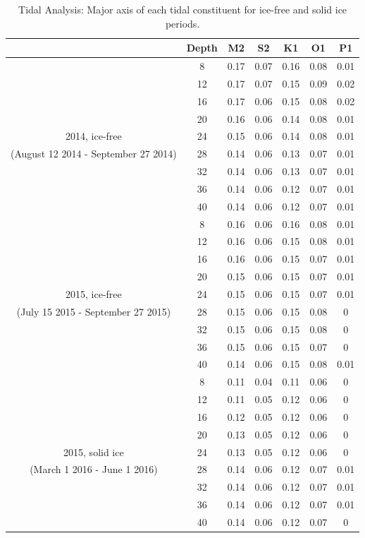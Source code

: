 \documentclass[12pt]{dforeport}
\begin{document}
\begin{table}[ht]
\centering
\caption[Major Axis of Tidal Constituents]{Tidal Analysis: Major axis of each tidal constituent for ice-free and solid ice periods.} 
\label{t:majorAxis}
\begin{tabular}{| c | c | c c c c c |}
\hline
& Depth & M2 & S2 & K1 & O1 & P1 \\
\hline
& 8 & 0.17 & 0.07 & 0.16 & 0.08 & 0.01 \\
& 12 & 0.17 & 0.07 & 0.15 & 0.09 & 0.02 \\
& 16 & 0.17 & 0.06 & 0.15 & 0.08 & 0.02 \\
& 20 & 0.16 & 0.06 & 0.14 & 0.08 & 0.01 \\
2014, ice-free & 24 & 0.15 & 0.06 & 0.14 & 0.08 & 0.01 \\ 
(August 12 2014 - September 27 2014) & 28 & 0.14 & 0.06 & 0.13 & 0.07 & 0.01 \\
& 32 & 0.14 & 0.06 & 0.13 & 0.07 & 0.01 \\
& 36 & 0.14 & 0.06 & 0.12 & 0.07 & 0.01 \\
& 40 & 0.14 & 0.06 & 0.12 & 0.07 & 0.01 \\
 \hline
& 8 & 0.16 & 0.06 & 0.16 & 0.08 & 0.01 \\
& 12 & 0.16 & 0.06 & 0.15 & 0.08 & 0.01 \\
& 16 & 0.16 & 0.06 & 0.15 & 0.07 & 0.01 \\
& 20 & 0.15 & 0.06 & 0.15 & 0.07 & 0.01 \\
2015, ice-free & 24 & 0.15 & 0.06 & 0.15 & 0.07 & 0.01 \\
(July 15 2015 - September 27 2015) & 28 & 0.15 & 0.06 & 0.15 & 0.08 & 0 \\
& 32 & 0.15 & 0.06 & 0.15 & 0.08 & 0 \\
& 36 & 0.15 & 0.06 & 0.15 & 0.07 & 0 \\
& 40 & 0.14 & 0.06 & 0.15 & 0.08 & 0.01 \\
 \hline
& 8 & 0.11 & 0.04 & 0.11 & 0.06 & 0 \\
& 12 & 0.11 & 0.05 & 0.12 & 0.06 & 0 \\
& 16 & 0.12 & 0.05 & 0.12 & 0.06 & 0 \\
& 20 & 0.13 & 0.05 & 0.12 & 0.06 & 0 \\
2015, solid ice  & 24 & 0.13 & 0.05 & 0.12 & 0.06 & 0 \\
(March 1 2016 - June 1 2016) & 28 & 0.14 & 0.06 & 0.12 & 0.07 & 0.01 \\ 
& 32 & 0.14 & 0.06 & 0.12 & 0.07 & 0.01 \\
& 36 & 0.14 & 0.06 & 0.12 & 0.07 & 0.01 \\
& 40 & 0.14 & 0.06 & 0.12 & 0.07 & 0 \\
 \hline
\end{tabular}
\end{table}
\end{document}
